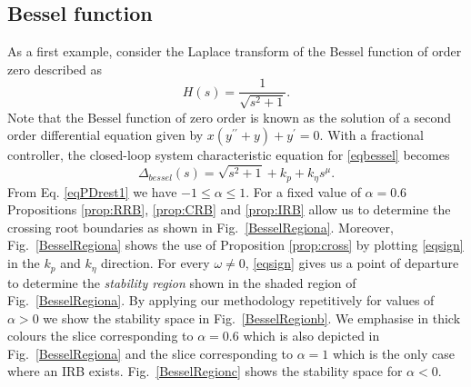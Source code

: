 \documentclass[twoside,reqno,11pt]{fcaa-var} %
\begin{document}
\subsection{Bessel function}
As a first example, consider the Laplace transform of the Bessel function of order zero described as
\begin{equation}
H(s)=\frac{1}{\sqrt{s^2+1}}. \label{eqbessel}
\end{equation}
Note that the Bessel function of zero order is known as the solution of a second order differential equation given by $x(y^{\prime\prime}+y)+y^\prime=0$. With a fractional controller, the closed-loop system characteristic equation for \eqref{eqbessel} becomes
\begin{equation}
\Delta_{bessel}(s)=\sqrt{s^2+1}+k_p+k_\eta s^\mu. \label{eqchbessel}
\end{equation} 
From Eq. \eqref{eqPDrest1} we have $ -1\leq\alpha\leq 1$. For a fixed value of $\alpha=0.6$ Propositions \ref{prop:RRB}, \ref{prop:CRB} and \ref{prop:IRB} allow us to determine the crossing root boundaries as shown in Fig.~\ref{BesselRegiona}. Moreover, Fig.~\ref{BesselRegiona} shows the use of Proposition \ref{prop:cross} by plotting \eqref{eqsign} in the $k_p$ and $k_\eta$ direction. For every $\omega\neq0$, \eqref{eqsign} gives us a point of departure to determine the \textit{stability region} shown in the shaded region of Fig.~\ref{BesselRegiona}. By applying our methodology repetitively for values of $\alpha>0$ we show the stability space in Fig.~\ref{BesselRegionb}. We emphasise in thick colours the slice corresponding to $\alpha=0.6$ which is also depicted in Fig.~\ref{BesselRegiona} and the slice corresponding to $\alpha=1$ which is the only case where an IRB exists. Fig.~\ref{BesselRegionc} shows the stability space for $\alpha<0$.\par
\end{document}
